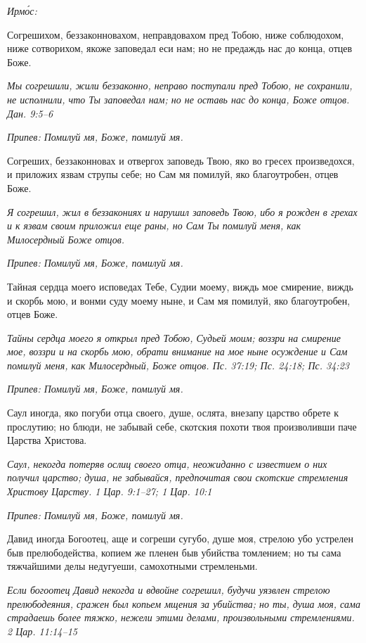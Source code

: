 \itshape Ирмо́с:\normalfont{}


Согрешихом, беззаконновахом, неправдовахом пред Тобою, ниже соблюдохом, ниже сотворихом, якоже заповедал еси нам; но не предаждь нас до конца, отцев Боже.


\itshape Мы согрешили, жили беззаконно, неправо поступали пред Тобою, не сохранили, не исполнили, что Ты заповедал нам; но не оставь нас до конца, Боже отцов. Дан. 9:5–6\normalfont{}


\itshape Припев:\normalfont{} Помилуй мя, Боже, помилуй мя.


Согреших, беззаконновах и отвергох заповедь Твою, яко во гресех произведохся, и приложих язвам струпы себе; но Сам мя помилуй, яко благоутробен, отцев Боже.


\itshape Я согрешил, жил в беззакониях и нарушил заповедь Твою, ибо я рожден в грехах и к язвам своим приложил еще раны, но Сам Ты помилуй меня, как Милосердный Боже отцов.\normalfont{}


\itshape Припев:\normalfont{} Помилуй мя, Боже, помилуй мя.


Тайная сердца моего исповедах Тебе, Судии моему, виждь мое смирение, виждь и скорбь мою, и вонми суду моему ныне, и Сам мя помилуй, яко благоутробен, отцев Боже.


\itshape Тайны сердца моего я открыл пред Тобою, Судьей моим; воззри на смирение мое, воззри и на скорбь мою, обрати внимание на мое ныне осуждение и Сам помилуй меня, как Милосердный, Боже отцов. Пс. 37:19; Пс. 24:18; Пс. 34:23\normalfont{}


\itshape Припев:\normalfont{} Помилуй мя, Боже, помилуй мя.


Саул иногда, яко погуби отца своего, душе, ослята, внезапу царство обрете к прослутию; но блюди, не забывай себе, скотския похоти твоя произволивши паче Царства Христова.


\itshape Саул, некогда потеряв ослиц своего отца, неожиданно с известием о них получил царство; душа, не забывайся, предпочитая свои скотские стремления Христову Царству. 1 Цар. 9:1–27; 1 Цар. 10:1\normalfont{}


\itshape Припев:\normalfont{} Помилуй мя, Боже, помилуй мя.


Давид иногда Богоотец, аще и согреши сугубо, душе моя, стрелою убо устрелен быв прелюбодейства, копием же пленен быв убийства томлением; но ты сама тяжчайшими делы недугуеши, самохотными стремленьми.


\itshape Если богоотец Давид некогда и вдвойне согрешил, будучи уязвлен стрелою прелюбодеяния, сражен был копьем мщения за убийства; но ты, душа моя, сама страдаешь более тяжко, нежели этими делами, произвольными стремлениями. 2 Цар. 11:14–15\normalfont{}


